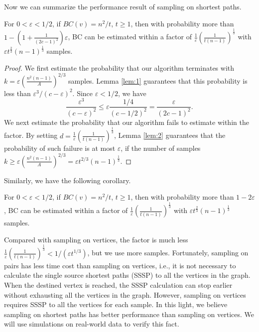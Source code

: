 \documentclass[10pt]{article}
\begin{document}
Now we can summarize the performance result of sampling on shortest paths.

\begin{theorem}
\label{thm:main2}
For $0<\varepsilon < 1/2$, if $BC(v) = n^2/t$, $t\geq 1$, then with probability more than $1-\left(1+\frac{1}{(2c-1)^2}\right)\varepsilon$, BC can be estimated within a factor of $\frac{1}{\varepsilon}\left(\frac{1}{t(n-1)}\right)^{\frac{1}{3}}$ with $\varepsilon t^{\frac{2}{3}}(n-1)^{\frac{1}{3}}$ samples.
\end{theorem}
\begin{proof}
We first estimate the probability that our algorithm terminates with $k=\varepsilon (\frac{n^2(n-1)}{A})^{2/3}$ samples. Lemma \ref{lem:1} guarantees that this probability is less than $\varepsilon^3/(c-\varepsilon)^2$. Since $\varepsilon < 1/2$, we have
$$\frac{\varepsilon^3}{(c-\varepsilon)^2} \leq \varepsilon \frac{1/4}{(c-1/2)^2}=\frac{\varepsilon}{(2c-1)^2}.$$
We next estimate the probability that our algorithm fails to estimate within the factor. By setting $d=\frac{1}{\varepsilon}\left(\frac{1}{t(n-1)}\right)^{\frac{1}{3}}$, Lemma \ref{lem:2} guarantees that the probability of such failure is at most $\varepsilon$, if the number of samples $k\geq \varepsilon (\frac{n^2(n-1)}{A})^{2/3}=\varepsilon t^{2/3}(n-1)^{\frac{1}{3}}$.
\end{proof}

Similarly, we have the following corollary.
\begin{corollary}
For $0<\varepsilon < 1/2$, if $BC(v) = n^2/t$, $t\geq 1$, then with probability more than $1-2\varepsilon$, BC can be estimated within a factor of $\frac{1}{\varepsilon}\left(\frac{1}{t(n-1)}\right)^{\frac{1}{3}}$ with $\varepsilon t^{\frac{2}{3}}(n-1)^{\frac{1}{3}}$ samples.
\end{corollary}
Compared with sampling on vertices, the factor is much less $\frac{1}{\varepsilon}\left(\frac{1}{t(n-1)}\right)^{\frac{1}{3}} < 1/(\varepsilon t^{1/3})$, but we use more samples. Fortunately, sampling on pairs has less time cost than sampling on vertices, i.e., it is not necessary to calculate the single source shortest paths (SSSP) to all the vertices in the graph. When the destined vertex is reached, the SSSP calculation can stop earlier without exhausting all the vertices in the graph. However, sampling on vertices requires SSSP to all the vertices for each sample. In this light, we believe sampling on shortest paths has better performance than sampling on vertices. We will use simulations on real-world data to verify this fact.



\end{document}
